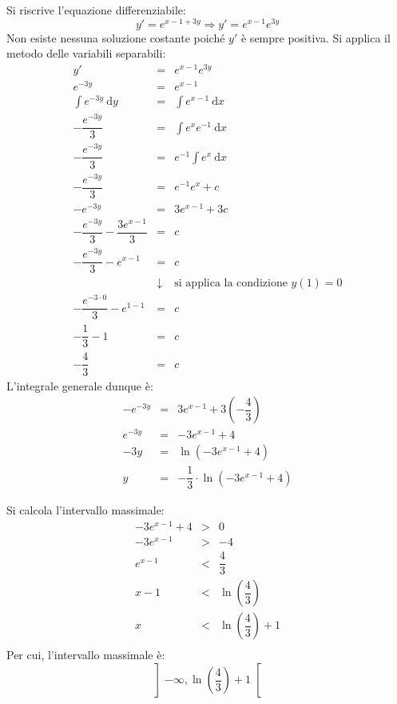 \documentclass[a4paper]{article}
\begin{document}
	\noindent
	Si riscrive l'equazione differenziabile:
	\begin{equation*}
		y' = e^{x-1+3y} \Longrightarrow y' = e^{x-1}e^{3y}
	\end{equation*}
	Non esiste nessuna soluzione costante poiché $y'$ è sempre positiva. Si applica il metodo delle variabili separabili:
	\begin{equation*}
		\begin{array}{rcl}
			y' &=& e^{x-1}e^{3y} \\ [1em]
			e^{-3y} &=& e^{x-1} \\ [1em]
			\displaystyle\int e^{-3y} \:\mathrm{d}y &=& \displaystyle\int e^{x-1} \:\mathrm{d}x \\ [1em]
			-\dfrac{e^{-3y}}{3} &=& \displaystyle\int e^{x}e^{-1} \:\mathrm{d}x \\ [1em]
			-\dfrac{e^{-3y}}{3} &=& e^{-1}\displaystyle\int e^{x} \:\mathrm{d}x \\ [1em]
			-\dfrac{e^{-3y}}{3} &=& e^{-1} e^{x} + c\\ [1em]
			-e^{-3y} &=& 3e^{x-1} + 3c \\ [.5em]
			-\dfrac{e^{-3y}}{3} -\dfrac{3e^{x-1}}{3} &=& c \\ [1em]
			-\dfrac{e^{-3y}}{3} -e^{x-1} &=& c \\
			&\downarrow& \text{si applica la condizione }y\left(1\right) = 0 \\
			-\dfrac{e^{-3 \cdot 0}}{3} -e^{1-1} &=& c \\
			-\dfrac{1}{3} - 1 &=& c \\
			-\dfrac{4}{3} &=& c
		\end{array}
	\end{equation*}
	L'integrale generale dunque è:
	\begin{equation*}
		\begin{array}{rcl}
			-e^{-3y} &=& 3e^{x-1} + 3 \left(-\dfrac{4}{3}\right) \\ [1em]
			e^{-3y} &=& -3e^{x-1} + 4 \\ [1em]
			-3y &=& \ln\left(-3e^{x-1} + 4\right) \\ [1em]
			y &=& -\dfrac{1}{3} \cdot \ln\left(-3e^{x-1} + 4\right)
		\end{array}
	\end{equation*}\newpage

	\noindent
	Si calcola l'intervallo massimale:
	\begin{equation*}
		\begin{array}{rcl}
			-3e^{x-1} + 4 &>& 0 \\ [.5em]
			-3e^{x-1} &>& -4 \\ [.5em]
			e^{x-1} &<& \dfrac{4}{3} \\ [1em]
			x-1 &<& \ln\left(\dfrac{4}{3}\right) \\ [1em]
			x &<& \ln\left(\dfrac{4}{3}\right) + 1 \\ [1em]
		\end{array}
	\end{equation*}
	Per cui, l'intervallo massimale è:
	\begin{equation*}
		\left]-\infty , \ln\left(\dfrac{4}{3}\right) + 1 \right[
	\end{equation*}
	
\end{document}
